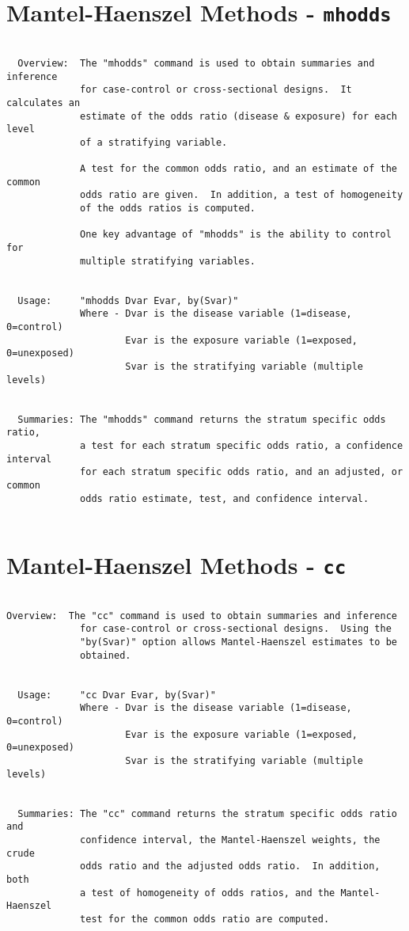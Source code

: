 \documentclass[a4paper,12pt]{article}
\begin{document}
\section*{Mantel-Haenszel Methods - \texttt{mhodds}}

\begin{verbatim}

  Overview:  The "mhodds" command is used to obtain summaries and inference
             for case-control or cross-sectional designs.  It calculates an
             estimate of the odds ratio (disease & exposure) for each level 
             of a stratifying variable.  
             
             A test for the common odds ratio, and an estimate of the common 
             odds ratio are given.  In addition, a test of homogeneity 
             of the odds ratios is computed.

             One key advantage of "mhodds" is the ability to control for
             multiple stratifying variables.


  Usage:     "mhodds Dvar Evar, by(Svar)"
             Where - Dvar is the disease variable (1=disease, 0=control)
                     Evar is the exposure variable (1=exposed, 0=unexposed)
                     Svar is the stratifying variable (multiple levels)


  Summaries: The "mhodds" command returns the stratum specific odds ratio,
             a test for each stratum specific odds ratio, a confidence interval
             for each stratum specific odds ratio, and an adjusted, or common
             odds ratio estimate, test, and confidence interval.
             
\end{verbatim}
\newpage
\section*{Mantel-Haenszel Methods - \texttt{cc}}

\begin{verbatim}

Overview:  The "cc" command is used to obtain summaries and inference
             for case-control or cross-sectional designs.  Using the
             "by(Svar)" option allows Mantel-Haenszel estimates to be 
             obtained.


  Usage:     "cc Dvar Evar, by(Svar)"
             Where - Dvar is the disease variable (1=disease, 0=control)
                     Evar is the exposure variable (1=exposed, 0=unexposed)
                     Svar is the stratifying variable (multiple levels)


  Summaries: The "cc" command returns the stratum specific odds ratio and
             confidence interval, the Mantel-Haenszel weights, the crude
             odds ratio and the adjusted odds ratio.  In addition, both 
             a test of homogeneity of odds ratios, and the Mantel-Haenszel
             test for the common odds ratio are computed.

\end{verbatim}
\end{document}
